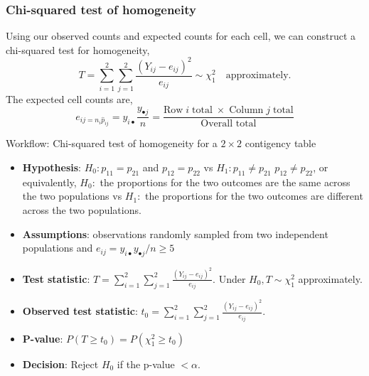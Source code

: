 \documentclass[a4paper]{article}\usepackage[]{graphicx}\usepackage[]{xcolor}
\begin{document}
\subsubsection{Chi-squared test of homogeneity}
Using our observed counts and expected counts for each cell, we can construct a chi-squared test for homogeneity,
\[
	T = \sum_{i=1}^{2} \sum_{j=1}^{2} \frac{(Y_{ij}-e_{ij})^2}{e_{ij}} \sim \chi_1^2 \quad\text{approximately}.
\]
The expected cell counts are,
\[
	e_{ij = n_i \hat{p}_{ij}} = y_{i \bullet} \frac{y_{\bullet j}}{n} = \frac{\text{Row}\;i\;\text{total}\;\times\;\text{Column}\;j\;\text{total}}{\text{Overall total}}
\]
\begin{redbox}{Workflow: Chi-squared test of homogeneity for a \texorpdfstring{\( 2 \times 2 \)}{2 x 2} contigency table}
	\begin{itemize}
		\item \textbf{Hypothesis}: \( H_0: p_{11} = p_{21} \) and \( p_{12} = p_{22} \) vs \( H_1: p_{11} \neq p_{21} \) \( p_{12} \neq p_{22} \), or equivalently, \( H_0: \) the proportions for the two outcomes are the same across the two populations vs \( H_1: \) the proportions for the two outcomes are different across the two populations. 
		\item \textbf{Assumptions}: observations randomly sampled from two independent populations and \( e_{ij} =y_{i \bullet} y_{\bullet j}/n \geq 5 \)
		\item \textbf{Test statistic}: \( T = \sum\limits_{i=1}^{2}\sum\limits_{j=1}^{2} \frac{(Y_{ij} - e_{ij})^2}{e_{ij}} \). Under \( H_0, T \sim \chi^2_1 \) approximately.
		\item \textbf{Observed test statistic}: \( t_0 = \sum\limits_{i=1}^{2}\sum\limits_{j=1}^{2} \frac{(Y_{ij} - e_{ij})^2}{e_{ij}} \).
		\item \textbf{P-value}: \( P(T\geq t_0) = P(\chi^2_1 \geq t_0) \)
		\item \textbf{Decision}: Reject \( H_0 \) if the p-value \( < \alpha \).
	\end{itemize}
\end{redbox}
\end{document}
